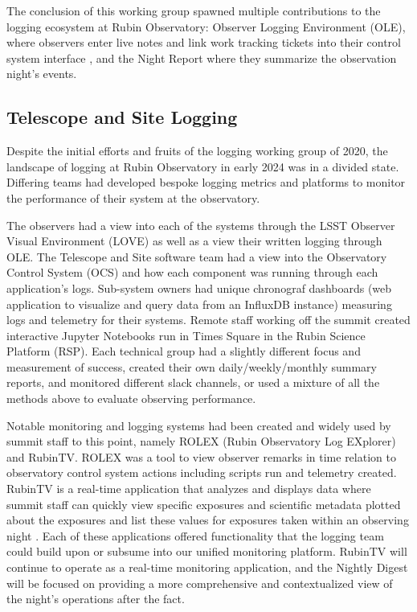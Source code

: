 The conclusion of this working group spawned multiple contributions to the logging
ecosystem at Rubin Observatory: Observer Logging Environment (OLE), where observers enter
live notes and link work tracking tickets into their control system interface
\cite{Aranda26}, and the Night Report where they summarize the observation night’s events.

\subsection{Telescope and Site Logging}

Despite the initial efforts and fruits of the logging working group of 2020, the landscape
of logging at Rubin Observatory in early 2024 was in a divided state. Differing teams had
developed bespoke logging metrics and platforms to monitor the performance of their system
at the observatory.

The observers had a view into each of the systems through the LSST Observer Visual
Environment (LOVE) as well as a view their written logging through OLE\cite{Aranda26}. The
Telescope and Site software team had a view into the Observatory Control System (OCS) and how
each component was running through each application's logs. Sub-system owners had unique
chronograf dashboards (web application to visualize and query data from an InfluxDB instance)
measuring logs and telemetry for their systems. Remote staff working off the summit created
interactive Jupyter Notebooks run in Times Square in the Rubin Science Platform (RSP).
Each technical group had a slightly different focus and measurement of success,
created their own daily/weekly/monthly summary reports, and monitored different slack channels,
or used a mixture of all the methods above to evaluate observing performance.

Notable monitoring and logging systems had been created and widely used by summit staff to
this point, namely ROLEX (Rubin Observatory Log EXplorer) and RubinTV. ROLEX was a tool to
view observer remarks in time relation to observatory control system actions including scripts
run and telemetry created. RubinTV is a real-time application that analyzes and displays
data where summit staff can quickly view specific exposures and scientific metadata
plotted about the exposures and list these values for exposures taken within an observing
night \cite{RubinTV-Phalanx}. Each of these applications offered functionality that the
logging team could build upon or subsume into our unified monitoring platform. RubinTV will continue
to operate as a real-time monitoring application, and the Nightly Digest will be focused on providing
a more comprehensive and contextualized view of the night’s operations after the fact.

